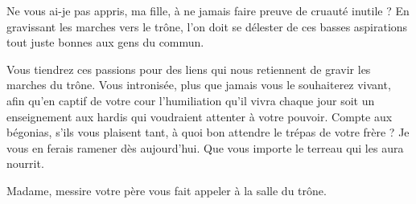 \begin{drama}
  \reinespeaks Ne vous ai-je pas appris, ma fille, à ne jamais faire preuve de cruauté inutile ? En gravissant les marches vers le trône, l’on doit se délester de ces basses aspirations tout juste bonnes aux gens du commun.

  Vous tiendrez ces passions pour des liens qui nous retiennent de gravir les marches du trône.%
  Vous intronisée, plus que jamais vous le souhaiterez vivant, afin qu’en captif de votre cour l’humiliation qu’il vivra chaque jour soit un enseignement aux hardis qui voudraient attenter à votre pouvoir. Compte aux bégonias, s’ils vous plaisent tant, à quoi bon attendre le trépas de votre frère ? Je vous en ferais ramener dès aujourd’hui. Que vous importe le terreau qui les aura nourrit.

  \suivanteprincessespeaks Madame, messire votre père vous fait appeler à la salle du trône.
%
%
%
\end{drama}

\scene

\StageDirII{\roi, \reine, \princesse, \elena, \alexas, \general}



